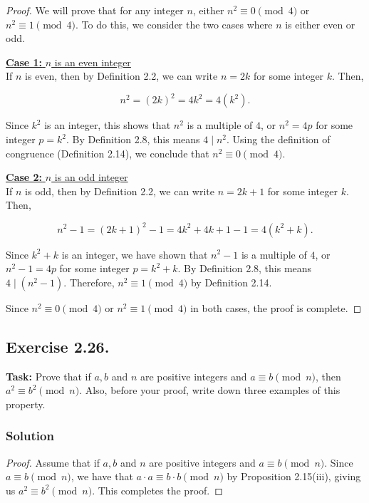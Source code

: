 \documentclass{article}
\begin{document}
\begin{proof}
    We will prove that for any integer $n$, either $n^2 \equiv 0 \pmod{4}$ or $n^2 \equiv 1 \pmod{4}$. To do this, we consider the two cases where $n$ is either even or odd.

    \underline{\textbf{Case 1:} $n$ is an even integer}\\

    If $n$ is even, then by Definition 2.2, we can write $n = 2k$ for some integer $k$. Then,

    \[
    n^2 = (2k)^2 = 4k^2 = 4(k^2).
    \]

    Since $k^2$ is an integer, this shows that $n^2$ is a multiple of $4$, or $n^2 = 4p$ for some integer $p = k^2$. By Definition 2.8, this means $4 \mid n^2$. Using the definition of congruence (Definition 2.14), we conclude that $n^2 \equiv 0 \pmod{4}$.

    \underline{\textbf{Case 2:} $n$ is an odd integer}\\

    If $n$ is odd, then by Definition 2.2, we can write $n = 2k + 1$ for some integer $k$. Then,

    \[
    n^2 - 1 = (2k + 1)^2 - 1 = 4k^2 + 4k + 1 - 1 = 4(k^2 + k).
    \]

    Since $k^2 + k$ is an integer, we have shown that $n^2 - 1$ is a multiple of $4$, or $n^2 - 1 = 4p$ for some integer $p = k^2 + k$. By Definition 2.8, this means $4 \mid (n^2 - 1)$. Therefore, $n^2 \equiv 1 \pmod{4}$ by Definition 2.14.

    Since $n^2 \equiv 0 \pmod{4}$ or $n^2 \equiv 1 \pmod{4}$ in both cases, the proof is complete.
\end{proof}

\newpage

\subsection{Exercise 2.26.}
\textbf{Task:} Prove that if $a,b$ and $n$ are positive integers and $a \equiv b \pmod{n}$, then $a^2 \equiv b^2 \pmod{n}$. Also, before your proof, write down three examples of this property.

\subsubsection*{Solution}

\begin{proof}
    Assume that if $a,b$ and $n$ are positive integers and $a \equiv b \pmod{n}$. Since $a \equiv b \pmod{n}$, we have that $a \cdot a \equiv b \cdot b \pmod{n}$ by Proposition 2.15(iii), giving us $a^2 \equiv b^2 \pmod{n}$. This completes the proof.
\end{proof}
\end{document}
